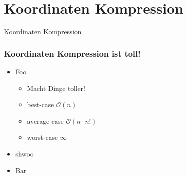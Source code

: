 \section{Koordinaten Kompression}
\begin{frame}
	\begin{center}
		{Koordinaten Kompression}
	\end{center}
\end{frame}

\begin{frame}
	\frametitle{{Koordinaten Kompression ist toll!}}
	\begin{itemize}
		\item Foo
		\begin{itemize}
			\item Macht Dinge toller! 
			\item best-case $\mathcal O(n)$
			\item average-case $\mathcal O(n\cdot n!)$
			\item worst-case $\infty$
		\end{itemize}
		\item shwoo
		\item {Bar}
	\end{itemize}
\end{frame}